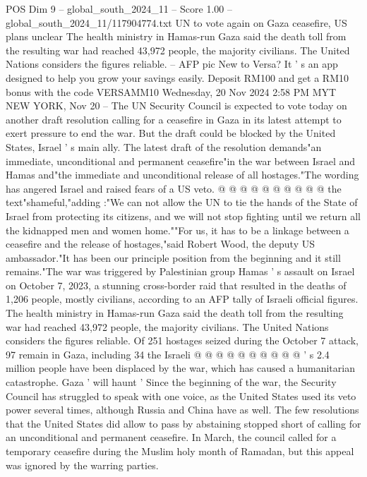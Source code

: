 \begin{textsample}{POS Dim 9 – global\_south\_2024\_11 – Score 1.00 – global\_south\_2024\_11/117904774.txt}  \label{ex:f9_pos_148}
UN to vote again on Gaza ceasefire, US plans unclear The health ministry in Hamas-run Gaza said the death toll from the resulting war had reached 43,972 people, the majority civilians.
The United Nations considers the figures reliable. -- AFP pic New to Versa?
It ' s an app designed to help you grow your savings easily.
Deposit RM100 and get a RM10 bonus with the code VERSAMM10 Wednesday, 20 Nov 2024 2:58 PM MYT NEW YORK, Nov 20 -- The UN Security Council is expected to vote today on another draft resolution calling for a ceasefire in Gaza in its latest attempt to exert pressure to end the war.
But the draft could be blocked by the United States, Israel ' s main ally.
The latest draft of the resolution demands"an immediate, unconditional and permanent ceasefire"in the war between Israel and Hamas and"the immediate and unconditional release of all hostages."The wording has angered Israel and raised fears of a US veto. @ @ @ @ @ @ @ @ @ @ the text"shameful,"adding :"We can not allow the UN to tie the hands of the State of Israel from protecting its citizens, and we will not stop fighting until we return all the kidnapped men and women home.""For us, it has to be a linkage between a ceasefire and the release of hostages,"said Robert Wood, the deputy US ambassador."It has been our principle position from the beginning and it still remains."The war was triggered by Palestinian group Hamas ' s assault on Israel on October 7, 2023, a stunning cross-border raid that resulted in the deaths of 1,206 people, mostly civilians, according to an AFP tally of Israeli official figures.
The health ministry in Hamas-run Gaza said the death toll from the resulting war had reached 43,972 people, the majority civilians.
The United Nations considers the figures reliable.
Of 251 hostages seized during the October 7 attack, 97 remain in Gaza, including 34 the Israeli @ @ @ @ @ @ @ @ @ @ ' s 2.4 million people have been displaced by the war, which has caused a humanitarian catastrophe.
Gaza ' will haunt ' Since the beginning of the war, the Security Council has struggled to speak with one voice, as the United States used its veto power several times, although Russia and China have as well.
The few resolutions that the United States did allow to pass by abstaining stopped short of calling for an unconditional and permanent ceasefire.
In March, the council called for a temporary ceasefire during the Muslim holy month of Ramadan, but this appeal was ignored by the warring parties.

\end{textsample}
